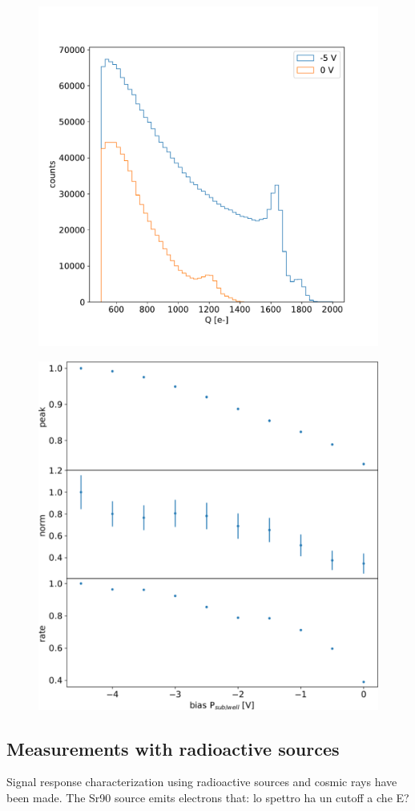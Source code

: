         \begin{figure}[h!]
            \centering
            \includegraphics[width=.60\linewidth]{figures/charaterization/Fe_spectrum_bias.pdf}
            \caption{}
            \label{fig:Fe_spectrum_bias}
        \end{figure}            
   
        \begin{figure}[h!]
            \centering
            \includegraphics[width=.70\linewidth]{figures/charaterization/Fe_param_vs_bias.pdf}
            \caption{}
            \label{fig:Fe_param_vs_bias}
        \end{figure}     


    \subsection{Measurements with radioactive sources}
        Signal response characterization using radioactive sources and cosmic rays have been made. 
        The Sr90 source emits electrons that: lo spettro ha un cutoff a che E?  

